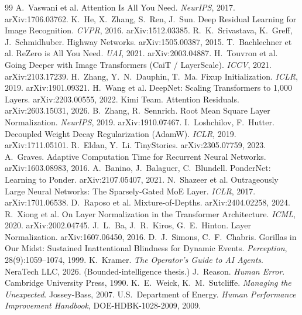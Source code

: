 \documentclass[12pt]{article}
\begin{document}
\begin{thebibliography}{99}
\small
{} A.~Vaswani et al. Attention Is All You Need. \emph{NeurIPS}, 2017. arXiv:1706.03762.
 K.~He, X.~Zhang, S.~Ren, J.~Sun. Deep Residual Learning for Image Recognition. \emph{CVPR}, 2016. arXiv:1512.03385.
 R.~K.~Srivastava, K.~Greff, J.~Schmidhuber. Highway Networks. arXiv:1505.00387, 2015.
 T.~Bachlechner et al. ReZero is All You Need. \emph{UAI}, 2021. arXiv:2003.04887.
 H.~Touvron et al. Going Deeper with Image Transformers (CaiT / LayerScale). \emph{ICCV}, 2021. arXiv:2103.17239.
 H.~Zhang, Y.~N.~Dauphin, T.~Ma. Fixup Initialization. \emph{ICLR}, 2019. arXiv:1901.09321.
 H.~Wang et al. DeepNet: Scaling Transformers to 1{,}000 Layers. arXiv:2203.00555, 2022.
 Kimi Team. Attention Residuals. arXiv:2603.15031, 2026.
 B.~Zhang, R.~Sennrich. Root Mean Square Layer Normalization. \emph{NeurIPS}, 2019. arXiv:1910.07467.
 I.~Loshchilov, F.~Hutter. Decoupled Weight Decay Regularization (AdamW). \emph{ICLR}, 2019. arXiv:1711.05101.
 R.~Eldan, Y.~Li. TinyStories. arXiv:2305.07759, 2023.
 A.~Graves. Adaptive Computation Time for Recurrent Neural Networks. arXiv:1603.08983, 2016.
 A.~Banino, J.~Balaguer, C.~Blundell. PonderNet: Learning to Ponder. arXiv:2107.05407, 2021.
 N.~Shazeer et al. Outrageously Large Neural Networks: The Sparsely-Gated MoE Layer. \emph{ICLR}, 2017. arXiv:1701.06538.
 D.~Raposo et al. Mixture-of-Depths. arXiv:2404.02258, 2024.
 R.~Xiong et al. On Layer Normalization in the Transformer Architecture. \emph{ICML}, 2020. arXiv:2002.04745.
 J.~L.~Ba, J.~R.~Kiros, G.~E.~Hinton. Layer Normalization. arXiv:1607.06450, 2016.
 D.~J.~Simons, C.~F.~Chabris. Gorillas in Our Midst: Sustained Inattentional Blindness for Dynamic Events. \emph{Perception}, 28(9):1059--1074, 1999.
 K.~Kramer. \emph{The Operator's Guide to AI Agents}. NeraTech LLC, 2026. (Bounded-intelligence thesis.)
 J.~Reason. \emph{Human Error}. Cambridge University Press, 1990.
 K.~E.~Weick, K.~M.~Sutcliffe. \emph{Managing the Unexpected}. Jossey-Bass, 2007.
 U.S.\ Department of Energy. \emph{Human Performance Improvement Handbook}, DOE-HDBK-1028-2009, 2009.
\end{thebibliography}
\end{document}
